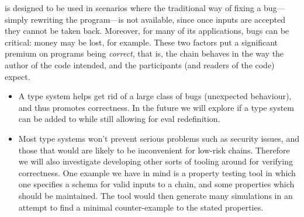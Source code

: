 \rad{} is designed to be used in scenarios where the traditional way of fixing a bug---simply rewriting the program---is not available, since once inputs are accepted they cannot be taken back. Moreover, for many of its applications, bugs can be critical: money may be lost, for example. These two factors put a significant premium on programs being \emph{correct}, that is, the chain
behaves in the way the author of the code intended, and the participants (and
readers of the code) expect.

\begin{itemize}
\item A type system helps get rid of a large class of bugs (unexpected
  behaviour), and thus promotes correctness. In the future we will explore if a
  type system can be added to \rad{} while still allowing for eval redefinition.
\item Most type systems won't prevent serious problems such as security issues,
  and those that would are likely to be inconvenient for low-risk chains.
  Therefore we will also investigate developing other sorts of tooling around
  \rad{} for verifying correctness. One example we have in mind is a property
  testing tool in which one specifies a schema for valid inputs to a chain, and
  some properties which should be maintained. The tool would then generate many
  simulations in an attempt to find a minimal counter-example to the stated
  properties.
\end{itemize}